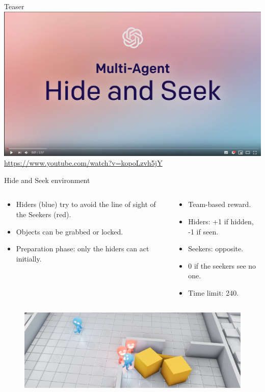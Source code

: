 \documentclass[9pt, hyperref={pdfusetitle,colorlinks=true,allcolors=DarkBlue}]{beamer}
\begin{document}
\begin{frame}{Teaser}
\centering
\includegraphics[scale=0.25]{teaser.png}
\url{https://www.youtube.com/watch?v=kopoLzvh5jY}
\end{frame}{}
\begin{frame}{Hide and Seek environment}

\begin{columns}
\begin{column}{0.5\textwidth}
\begin{itemize}
        \item Hiders (blue) try to avoid the line of sight of the Seekers (red).
        \item Objects can be grabbed or locked.
        \item Preparation phase: only the hiders can act initially.
    \end{itemize}{}
\end{column}
\begin{column}{0.5\textwidth}  %
    \begin{itemize}
        \item Team-based reward.
        \item Hiders: +1 if hidden, -1 if seen.
        \item Seekers: opposite.
        \item 0 if the seekers see no one.
        \item Time limit: 240.
    \end{itemize}{}
\end{column}
\end{columns}
\begin{figure}
\includegraphics[scale=0.4]{hasenv.png}
\end{figure}
\end{frame}{}
\end{document}
